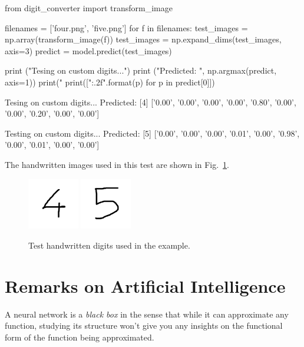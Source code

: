 \begin{ipython}
from digit_converter import transform_image

filenames = ['four.png', 'five.png']
for f in filenames:
    test_images = np.array(transform_image(f))
test_images = np.expand_dims(test_images, axis=3)
predict = model.predict(test_images)

print ("Tesing on custom digits...")
print ("Predicted: ", np.argmax(predict, axis=1))
print("%
print(["{:.2f}".format(p) for p in predict[0]])
\end{ipython}
\begin{ioutput}
Tesing on custom digits...
Predicted:  [4]
['0.00', '0.00', '0.00', '0.00', '0.80', '0.00', '0.00', '0.20', '0.00', 
'0.00']

Testing on custom digits...
Predicted:  [5]
['0.00', '0.00', '0.00', '0.01', '0.00', '0.98', '0.00', '0.01', '0.00', 
'0.00']
\end{ioutput}
The handwritten images used in this test are shown in Fig.~\ref{fig:test_images}.

\begin{figure}[htb]
\centering
\includegraphics[width=0.2\textwidth]{figures/four.png}
\includegraphics[width=0.2\textwidth]{figures/five.png}
\caption{Test handwritten digits used in the example.}
\label{fig:test_images}
\end{figure}

\section{Remarks on Artificial Intelligence}

A neural network is a \emph{black box} in the sense that while it can approximate any function, studying its structure won't give you any insights on the functional form of the function being approximated.

